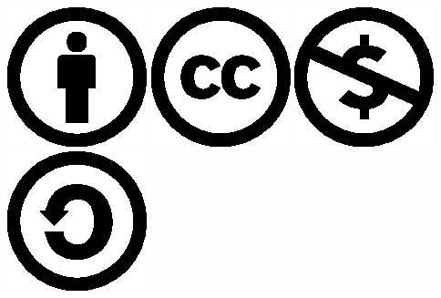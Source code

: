 \documentclass[a4paper,dottedtoc,headinclude,footinclude]{report} %
\theoremstyle{plain}
\begin{document}
    \begin{center}
    \includegraphics{gfx/cc-icons-eps/by}
    \includegraphics{gfx/cc-icons-eps/cc}
    \includegraphics{gfx/cc-icons-eps/nc}
    \includegraphics{gfx/cc-icons-eps/sa}
    \end{center}

\end{document}
